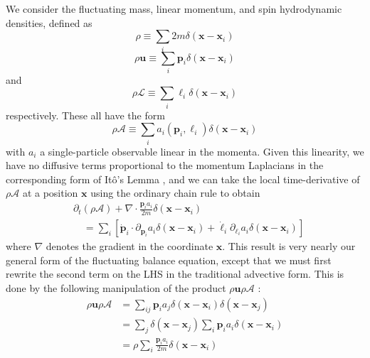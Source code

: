 \documentclass[%
 reprint,
superscriptaddress,
longbibliography,
 amsmath,amssymb,
 prl,
 citeautoscript,
]{revtex4-1}
\begin{document}
We consider the fluctuating mass, linear momentum, and spin hydrodynamic densities, defined as
\begin{equation}
\rho \equiv \sum_i 2 m \delta \left( {\boldsymbol x} - {\boldsymbol x}_i \right)
\label{eqn:mass_density_defn}
\end{equation}
\begin{equation}
\rho {\boldsymbol u} \equiv \sum_i {\boldsymbol p}_i \delta \left( {\boldsymbol x} - {\boldsymbol x}_i \right)
\label{eqn:momentum_density_defn}
\end{equation}
and
\begin{equation}
\rho \mathcal{L} \equiv \sum_i \ell_i \delta \left( {\boldsymbol x} - {\boldsymbol x}_i \right)
\label{eqn:spin_density_defn}
\end{equation}
respectively. These all have the form
\begin{equation}
\rho \mathcal{A} \equiv \sum_i a_i \left( {\boldsymbol p}_i, \ell_i \right) \delta \left( {\boldsymbol x} - {\boldsymbol x}_i \right)
\label{eqn:density_general}
\end{equation}
with $a_i$ a single-particle observable linear in the momenta. Given this linearity, we have no diffusive terms proportional to the momentum Laplacians in the corresponding form of It\^{o}'s Lemma \cite{dean, underdamped_dean}, and we can take the local time-derivative of $\rho \mathcal{A}$ at a position ${\boldsymbol x}$ using the ordinary chain rule to obtain
\begin{equation}
\begin{split}
&\partial_t \left( \rho \mathcal{A} \right) + \nabla \cdot \frac{{\boldsymbol p}_i a_i}{2m} \delta \left( {\boldsymbol x} - {\boldsymbol x}_i \right) \\
&\quad = \sum_i \left[ \dot{\boldsymbol p}_i \cdot \partial_{{\boldsymbol p}_i} a_i \delta \left( {\boldsymbol x} - {\boldsymbol x}_i \right) + \dot{\ell}_i \partial_{\ell_i} a_i \delta \left( {\boldsymbol x} - {\boldsymbol x}_i \right) \right]
\end{split}
\label{eqn:general_hydro1}
\end{equation}
where $\nabla$ denotes the gradient in the coordinate ${\boldsymbol x}$. This result is very nearly our general form of the fluctuating balance equation, except that we must first rewrite the second term on the LHS in the traditional advective form. This is done by the following manipulation of the product $\rho {\boldsymbol u} \rho \mathcal{A}$ \cite{dean}:
\begin{equation}
\begin{split}
\rho {\boldsymbol u} \rho \mathcal{A} &= \sum_{ij} {\boldsymbol p}_i a_j \delta \left( {\boldsymbol x} - {\boldsymbol x}_i \right) \delta \left( {\boldsymbol x} - {\boldsymbol x}_j \right) \\
&= \sum_j \delta \left( {\boldsymbol x} - {\boldsymbol x}_j \right) \sum_i {\boldsymbol p}_i a_i \delta \left( {\boldsymbol x} - {\boldsymbol x}_i \right) \\
&= \rho \sum_i \frac{{\boldsymbol p}_i a_i}{2m} \delta \left( {\boldsymbol x} - {\boldsymbol x}_i \right)
\end{split}
\label{eqn:density_product}
\end{equation}
\end{document}
